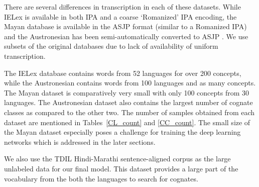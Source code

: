 \documentclass[11pt,letterpaper]{article}
\begin{document}
There are several differences in transcription in each of these datasets. While IELex is available in both IPA and a coarse `Romanized' IPA encoding, the Mayan database is available in the ASJP format (similar to a Romanized IPA) \cite{Brown:08} and the Austronesian has been semi-automatically converted to ASJP \cite{rama2016siamese}. We use subsets of the original databases due to lack of availability of uniform transcription.

The IELex database contains words from 52 languages for over 200 concepts, while the Austronesian contains words from 100 languages and as many concepts. The Mayan dataset is comparatively very small with only 100 concepts from 30 languages. The Austronesian dataset also contains the largest number of cognate classes as compared to the other two. The number of samples obtained from each dataset are mentioned in Tables~\ref{CL_count} and \ref{CC_count}. The small size of the Mayan dataset especially poses a challenge for training the deep learning networks which is addressed in the later sections. 

We also use the TDIL Hindi-Marathi sentence-aligned corpus as the large unlabeled data for our final model. This dataset provides a large part of the vocabulary from the both the languages to search for cognates.




\end{document}
